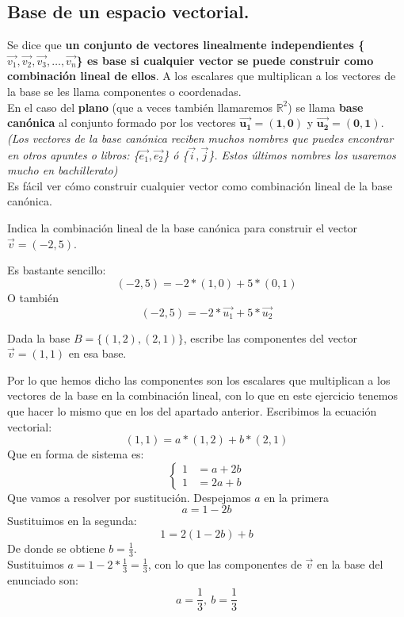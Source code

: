 \documentclass[a4paper,11pt,answers]{exam}
\begin{document}
\subsection{Base de un espacio vectorial.}
Se dice que \textbf{un conjunto de vectores linealmente independientes
  \{$\vec{v_1}, \vec{v_2}, \vec{v_3},\dots,\vec{v_n}$\} es base
  si cualquier vector se puede construir como combinación lineal de ellos}. A los escalares que
multiplican a los vectores de la base se les llama componentes o coordenadas.\\

En el caso del \textbf{plano} (que a veces también llamaremos $\mathbb{R}^2$) se llama
\textbf{base canónica} al conjunto formado por los vectores $\boldsymbol{\vec{u_1} = (1, 0)}$ y
$\boldsymbol{\vec{u_2} = (0,1)}$.\\
\emph{(Los vectores de la base canónica reciben muchos nombres que puedes encontrar en otros
  apuntes o libros: \{$\vec{e_1}, \vec{e_2}$\} ó \{$\vec{i},\vec{j}$\}. Estos últimos nombres los
  usaremos mucho en bachillerato)}\\

Es fácil ver cómo construir cualquier vector como combinación lineal de la base canónica.
\begin{questions}
\question Indica la combinación lineal de la base canónica para construir el vector
  $\vec{v} = (-2, 5)$.
  \begin{solution}
    Es bastante sencillo:
    \[(-2, 5) = -2*(1,0) + 5*(0,1)\]
    O también
    \[(-2, 5) = -2*\vec{u_1} + 5*\vec{u_2}\]
  \end{solution}
\question Dada la base $B=\{(1,2), (2,1)\}$, escribe las componentes del vector $\vec{v} = (1,1)$
  en esa base.
  \begin{solution}
    Por lo que hemos dicho las componentes son los escalares que multiplican a los vectores
    de la base en la combinación lineal, con lo que en este ejercicio tenemos que hacer lo mismo
    que en los del apartado anterior. Escribimos la ecuación vectorial:
    \[(1, 1) = a*(1, 2) + b*(2, 1)\]
    Que en forma de sistema es:
    \[
      \begin{cases}
        1 &=a + 2b\\
        1 &=2a +b
      \end{cases}
    \]
    Que vamos a resolver por sustitución. Despejamos $a$ en la primera
    \[a = 1- 2b\]
    Sustituimos en la segunda:
    \[1 = 2(1-2b) + b\]
    De donde se obtiene $b = \frac{1}{3}$.\\
    Sustituimos $a = 1- 2*\frac{1}{3} = \frac{1}{3}$, con lo que las componentes de $\vec{v}$ en
    la base del enunciado son:
    \[a= \frac{1}{3},\ b=\frac{1}{3}\]
  \end{solution}
\end{questions}
\end{document}
